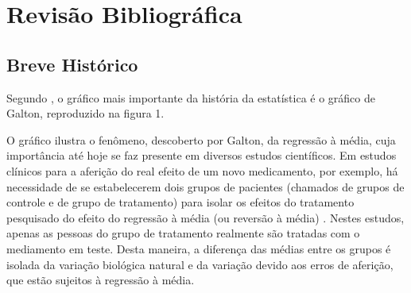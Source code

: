\documentclass[a4paper, 12pt]{article}
\begin{document}
\hypertarget{revisao-bibliografica}{%
\section{Revisão Bibliográfica}\label{revisao-bibliografica}}

\hypertarget{breve-historico}{%
\subsection{Breve Histórico}\label{breve-historico}}

\textcite{stigler1986}

Segundo \textcite[p.~347]{koenker2000}, o gráfico mais importante da
história da estatística é o gráfico de Galton, reproduzido na figura 1.

O gráfico ilustra o fenômeno, descoberto por Galton, da regressão à
média, cuja importância até hoje se faz presente em diversos estudos
científicos. Em estudos clínicos para a aferição do real efeito de um
novo medicamento, por exemplo, há necessidade de se estabelecerem dois
grupos de pacientes (chamados de grupos de controle e de grupo de
tratamento) para isolar os efeitos do tratamento pesquisado do efeito do
regressão à média (ou reversão à média) \autocite[ver][]{james1973}.
Nestes estudos, apenas as pessoas do grupo de tratamento realmente são
tratadas com o mediamento em teste. Desta maneira, a diferença das
médias entre os grupos é isolada da variação biológica natural e da
variação devido aos erros de aferição, que estão sujeitos à regressão à
média.
\end{document}
